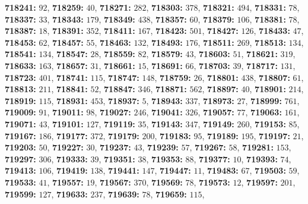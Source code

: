 \textsf{\bfseries 718241:} $92$, \textsf{\bfseries 718259:} $40$, \textsf{\bfseries 718271:} $282$, \textsf{\bfseries 718303:} $378$, \textsf{\bfseries 718321:} $494$, \textsf{\bfseries 718331:} $78$, \textsf{\bfseries 718337:} $33$, \textsf{\bfseries 718343:} $179$, \textsf{\bfseries 718349:} $438$, \textsf{\bfseries 718357:} $60$, \textsf{\bfseries 718379:} $106$, \textsf{\bfseries 718381:} $78$, \textsf{\bfseries 718387:} $18$, \textsf{\bfseries 718391:} $352$, \textsf{\bfseries 718411:} $167$, \textsf{\bfseries 718423:} $501$, \textsf{\bfseries 718427:} $126$, \textsf{\bfseries 718433:} $47$, \textsf{\bfseries 718453:} $62$, \textsf{\bfseries 718457:} $55$, \textsf{\bfseries 718463:} $132$, \textsf{\bfseries 718493:} $176$, \textsf{\bfseries 718511:} $269$, \textsf{\bfseries 718513:} $134$, \textsf{\bfseries 718541:} $134$, \textsf{\bfseries 718547:} $28$, \textsf{\bfseries 718559:} $82$, \textsf{\bfseries 718579:} $43$, \textsf{\bfseries 718603:} $51$, \textsf{\bfseries 718621:} $319$, \textsf{\bfseries 718633:} $163$, \textsf{\bfseries 718657:} $31$, \textsf{\bfseries 718661:} $15$, \textsf{\bfseries 718691:} $66$, \textsf{\bfseries 718703:} $39$, \textsf{\bfseries 718717:} $131$, \textsf{\bfseries 718723:} $401$, \textsf{\bfseries 718741:} $115$, \textsf{\bfseries 718747:} $148$, \textsf{\bfseries 718759:} $26$, \textsf{\bfseries 718801:} $438$, \textsf{\bfseries 718807:} $61$, \textsf{\bfseries 718813:} $211$, \textsf{\bfseries 718841:} $52$, \textsf{\bfseries 718847:} $346$, \textsf{\bfseries 718871:} $562$, \textsf{\bfseries 718897:} $40$, \textsf{\bfseries 718901:} $214$, \textsf{\bfseries 718919:} $115$, \textsf{\bfseries 718931:} $453$, \textsf{\bfseries 718937:} $5$, \textsf{\bfseries 718943:} $337$, \textsf{\bfseries 718973:} $27$, \textsf{\bfseries 718999:} $761$, \textsf{\bfseries 719009:} $91$, \textsf{\bfseries 719011:} $98$, \textsf{\bfseries 719027:} $246$, \textsf{\bfseries 719041:} $326$, \textsf{\bfseries 719057:} $77$, \textsf{\bfseries 719063:} $161$, \textsf{\bfseries 719071:} $43$, \textsf{\bfseries 719101:} $127$, \textsf{\bfseries 719119:} $35$, \textsf{\bfseries 719143:} $347$, \textsf{\bfseries 719149:} $260$, \textsf{\bfseries 719153:} $85$, \textsf{\bfseries 719167:} $186$, \textsf{\bfseries 719177:} $372$, \textsf{\bfseries 719179:} $200$, \textsf{\bfseries 719183:} $95$, \textsf{\bfseries 719189:} $195$, \textsf{\bfseries 719197:} $21$, \textsf{\bfseries 719203:} $50$, \textsf{\bfseries 719227:} $30$, \textsf{\bfseries 719237:} $43$, \textsf{\bfseries 719239:} $57$, \textsf{\bfseries 719267:} $58$, \textsf{\bfseries 719281:} $153$, \textsf{\bfseries 719297:} $306$, \textsf{\bfseries 719333:} $39$, \textsf{\bfseries 719351:} $38$, \textsf{\bfseries 719353:} $88$, \textsf{\bfseries 719377:} $10$, \textsf{\bfseries 719393:} $74$, \textsf{\bfseries 719413:} $106$, \textsf{\bfseries 719419:} $138$, \textsf{\bfseries 719441:} $147$, \textsf{\bfseries 719447:} $11$, \textsf{\bfseries 719483:} $67$, \textsf{\bfseries 719503:} $59$, \textsf{\bfseries 719533:} $41$, \textsf{\bfseries 719557:} $19$, \textsf{\bfseries 719567:} $370$, \textsf{\bfseries 719569:} $78$, \textsf{\bfseries 719573:} $12$, \textsf{\bfseries 719597:} $201$, \textsf{\bfseries 719599:} $127$, \textsf{\bfseries 719633:} $237$, \textsf{\bfseries 719639:} $78$, \textsf{\bfseries 719659:} $115$, 
